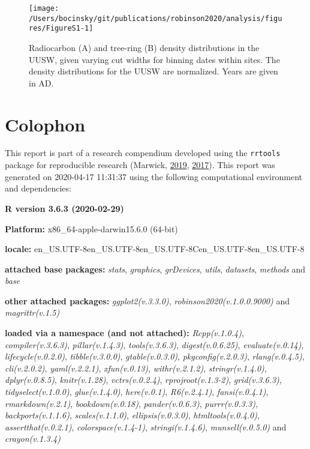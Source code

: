 \documentclass[
]{article}
\begin{document}
\begin{figure}

{\centering \texttt{[image: /Users/bocinsky/git/publications/robinson2020/analysis/figures/FigureS1-1]} 

}

\caption{Radiocarbon (A) and tree-ring (B) density distributions in the UUSW, given varying cut widths for binning dates within sites. The density distributions for the UUSW are normalized. Years are given in AD.}\label{fig:FigureS1}
\end{figure}

\newpage

\hypertarget{colophon}{%
\section*{Colophon}\label{colophon}}

This report is part of a research compendium developed using the \texttt{rrtools} package for reproducible research (Marwick, \protect\hyperlink{ref-rrtools}{2019}, \protect\hyperlink{ref-Marwick2017}{2017}). This report was generated on 2020-04-17 11:31:37 using the following computational environment and dependencies:

\textbf{R version 3.6.3 (2020-02-29)}

\textbf{Platform:} x86\_64-apple-darwin15.6.0 (64-bit)

\textbf{locale:}
en\_US.UTF-8\textbar\textbar en\_US.UTF-8\textbar\textbar en\_US.UTF-8\textbar\textbar C\textbar\textbar en\_US.UTF-8\textbar\textbar en\_US.UTF-8

\textbf{attached base packages:}
\emph{stats}, \emph{graphics}, \emph{grDevices}, \emph{utils}, \emph{datasets}, \emph{methods} and \emph{base}

\textbf{other attached packages:}
\emph{ggplot2(v.3.3.0)}, \emph{robinson2020(v.1.0.0.9000)} and \emph{magrittr(v.1.5)}

\textbf{loaded via a namespace (and not attached):}
\emph{Rcpp(v.1.0.4)}, \emph{compiler(v.3.6.3)}, \emph{pillar(v.1.4.3)}, \emph{tools(v.3.6.3)}, \emph{digest(v.0.6.25)}, \emph{evaluate(v.0.14)}, \emph{lifecycle(v.0.2.0)}, \emph{tibble(v.3.0.0)}, \emph{gtable(v.0.3.0)}, \emph{pkgconfig(v.2.0.3)}, \emph{rlang(v.0.4.5)}, \emph{cli(v.2.0.2)}, \emph{yaml(v.2.2.1)}, \emph{xfun(v.0.13)}, \emph{withr(v.2.1.2)}, \emph{stringr(v.1.4.0)}, \emph{dplyr(v.0.8.5)}, \emph{knitr(v.1.28)}, \emph{vctrs(v.0.2.4)}, \emph{rprojroot(v.1.3-2)}, \emph{grid(v.3.6.3)}, \emph{tidyselect(v.1.0.0)}, \emph{glue(v.1.4.0)}, \emph{here(v.0.1)}, \emph{R6(v.2.4.1)}, \emph{fansi(v.0.4.1)}, \emph{rmarkdown(v.2.1)}, \emph{bookdown(v.0.18)}, \emph{pander(v.0.6.3)}, \emph{purrr(v.0.3.3)}, \emph{backports(v.1.1.6)}, \emph{scales(v.1.1.0)}, \emph{ellipsis(v.0.3.0)}, \emph{htmltools(v.0.4.0)}, \emph{assertthat(v.0.2.1)}, \emph{colorspace(v.1.4-1)}, \emph{stringi(v.1.4.6)}, \emph{munsell(v.0.5.0)} and \emph{crayon(v.1.3.4)}
\end{document}
